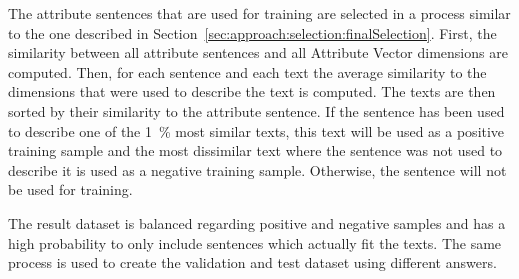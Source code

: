 The attribute sentences that are used for training are selected in a process similar to the one described in Section~\ref{sec:approach:selection:finalSelection}.
First, the similarity between all attribute sentences and all Attribute Vector dimensions are computed. Then, for each sentence and each text the average similarity to the dimensions that were used to describe the text is computed. The texts are then sorted by their similarity to the attribute sentence. If the sentence has been used to describe one of the \SI{1}{\percent} most similar texts, this text will be used as a positive training sample and the most dissimilar text where the sentence was not used to describe it is used as a negative training sample. Otherwise, the sentence will not be used for training.

The result dataset is balanced regarding positive and negative samples and has a high probability to only include sentences which actually fit the texts. %
The same process is used to create the validation and test dataset using different answers. %

